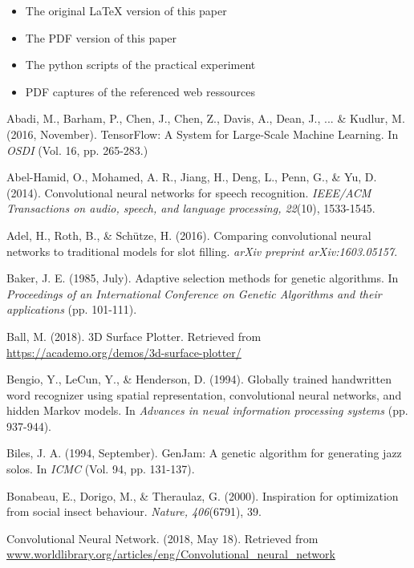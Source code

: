 \documentclass[11pt,a4paper,twoside,openright]{scrbook}
\begin{document}
\begin{itemize}
  \item The original LaTeX version of this paper
  \item The PDF version of this paper
  \item The python scripts of the practical experiment
  \item PDF captures of the referenced web ressources
\end{itemize}

\begin{thebibliography}{99}

 Abadi, M., Barham, P., Chen, J., Chen, Z., Davis, A., Dean, J., ... \& Kudlur, M. (2016, November). TensorFlow: A System for Large-Scale Machine Learning. In \emph{OSDI} (Vol. 16, pp. 265-283.)

 Abel-Hamid, O., Mohamed, A. R., Jiang, H., Deng, L., Penn, G., \& Yu, D. (2014). Convolutional neural networks for speech recognition. \emph{IEEE/ACM Transactions on audio, speech, and language processing, 22}(10), 1533-1545.

 Adel, H., Roth, B., \& Schütze, H. (2016). Comparing convolutional neural networks to traditional models for slot filling. \emph{arXiv preprint arXiv:1603.05157}.

 Baker, J. E. (1985, July). Adaptive selection methods for genetic algorithms. In \emph{Proceedings of an International Conference on Genetic Algorithms and their applications} (pp. 101-111).

 Ball, M. (2018). 3D Surface Plotter. Retrieved from \url{https://academo.org/demos/3d-surface-plotter/}

 Bengio, Y., LeCun, Y., \& Henderson, D. (1994). Globally trained handwritten word recognizer using spatial representation, convolutional neural networks, and hidden Markov models. In \emph{Advances in neual information processing systems} (pp. 937-944).

 Biles, J. A. (1994, September). GenJam: A genetic algorithm for generating jazz solos. In \emph{ICMC} (Vol. 94, pp. 131-137).

 Bonabeau, E., Dorigo, M., \& Theraulaz, G. (2000). Inspiration for optimization from social insect behaviour. \emph{Nature, 406}(6791), 39.

 Convolutional Neural Network. (2018, May 18). Retrieved from \url{www.worldlibrary.org/articles/eng/Convolutional_neural_network}


\end{thebibliography}
\end{document}
